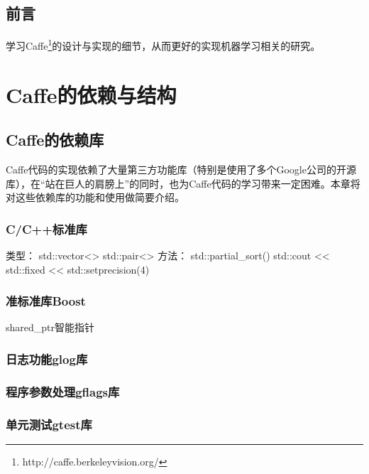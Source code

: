 \documentclass{../NanCNBook}
\title{\hei\chuhao{Caffe\cite{jia2014caffe}解析}}
\author{nannanmath}
\begin{document}
\maketitle{}
\thispagestyle{empty}

\frontmatter
\pagestyle{plain}
\chapter*{前{\quad}言}
学习Caffe\footnote{http://caffe.berkeleyvision.org/}的设计与实现的细节，从而更好的实现机器学习相关的研究。



\tableofcontents
\listoffigures
\listoftables


\mainmatter
\pagestyle{fancy}

\part{Caffe的依赖与结构}

\chapter{Caffe的依赖库}
Caffe代码的实现依赖了大量第三方功能库（特别是使用了多个Google公司的开源库），在“站在巨人的肩膀上”的同时，也为Caffe代码的学习带来一定困难。本章将对这些依赖库的功能和使用做简要介绍。
\section{C/C++标准库}
类型：
std::vector<>
std::pair<>
方法：
std::partial\_sort()
std::cout << std::fixed << std::setprecision(4)
\section{准标准库Boost}
shared\_ptr智能指针
\section{日志功能glog库}

\section{程序参数处理gflags库}

\section{单元测试gtest库}
\end{document}
